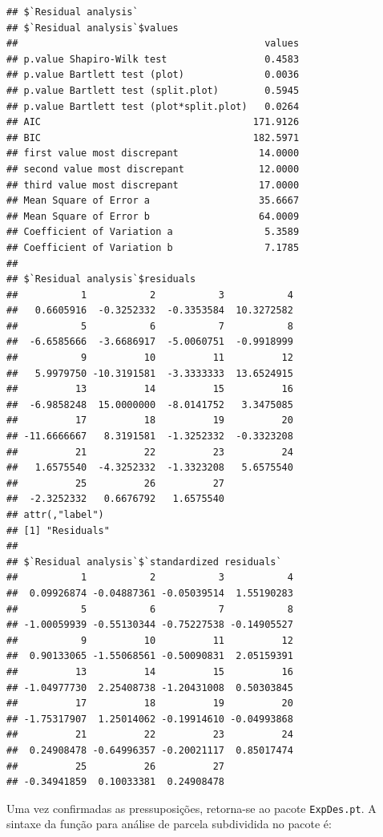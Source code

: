 \documentclass[
]{article}
\begin{document}
\begin{verbatim}
## $`Residual analysis`
## $`Residual analysis`$values
##                                           values
## p.value Shapiro-Wilk test                 0.4583
## p.value Bartlett test (plot)              0.0036
## p.value Bartlett test (split.plot)        0.5945
## p.value Bartlett test (plot*split.plot)   0.0264
## AIC                                     171.9126
## BIC                                     182.5971
## first value most discrepant              14.0000
## second value most discrepant             12.0000
## third value most discrepant              17.0000
## Mean Square of Error a                   35.6667
## Mean Square of Error b                   64.0009
## Coefficient of Variation a                5.3589
## Coefficient of Variation b                7.1785
## 
## $`Residual analysis`$residuals
##           1           2           3           4 
##   0.6605916  -0.3252332  -0.3353584  10.3272582 
##           5           6           7           8 
##  -6.6585666  -3.6686917  -5.0060751  -0.9918999 
##           9          10          11          12 
##   5.9979750 -10.3191581  -3.3333333  13.6524915 
##          13          14          15          16 
##  -6.9858248  15.0000000  -8.0141752   3.3475085 
##          17          18          19          20 
## -11.6666667   8.3191581  -1.3252332  -0.3323208 
##          21          22          23          24 
##   1.6575540  -4.3252332  -1.3323208   5.6575540 
##          25          26          27 
##  -2.3252332   0.6676792   1.6575540 
## attr(,"label")
## [1] "Residuals"
## 
## $`Residual analysis`$`standardized residuals`
##           1           2           3           4 
##  0.09926874 -0.04887361 -0.05039514  1.55190283 
##           5           6           7           8 
## -1.00059939 -0.55130344 -0.75227538 -0.14905527 
##           9          10          11          12 
##  0.90133065 -1.55068561 -0.50090831  2.05159391 
##          13          14          15          16 
## -1.04977730  2.25408738 -1.20431008  0.50303845 
##          17          18          19          20 
## -1.75317907  1.25014062 -0.19914610 -0.04993868 
##          21          22          23          24 
##  0.24908478 -0.64996357 -0.20021117  0.85017474 
##          25          26          27 
## -0.34941859  0.10033381  0.24908478
\end{verbatim}

Uma vez confirmadas as pressuposições, retorna-se ao pacote \texttt{ExpDes.pt}. A sintaxe da função para análise de parcela subdividida no pacote é:
\end{document}

